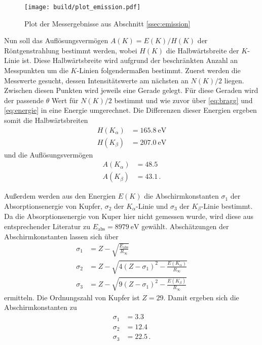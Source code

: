 \begin{figure}
    \centering
    \texttt{[image: build/plot\_emission.pdf]}
    \caption{Plot der Messergebnisse aus Abschnitt \ref{ssec:emission}}
    \label{fig:plot_emission}
\end{figure}

Nun soll das Auflösungsvermögen $A(K)=E(K)/H(K)$ der Röntgenstrahlung bestimmt werden, wobei $H(K)$ die Halbwärtsbreite der $K$-Linie ist.
Diese Halbwärtsbreite wird aufgrund der beschränkten Anzahl an Messpunkten um die $K$-Linien folgendermaßen bestimmt.
Zuerst werden die Messwerte gesucht, dessen Intensitätswerte am nächsten an $N(K)/2$ liegen.
Zwischen diesen Punkten wird jeweils eine Gerade gelegt.
Für diese Geraden wird der passende $\theta$ Wert für $N(K)/2$ bestimmt und wie zuvor über \autoref{eq:bragg} und \autoref{eq:energie} in eine Energie umgerechnet.
Die Differenzen dieser Energien ergeben somit die Halbwärtsbreiten
\begin{align*}
    H(K_\alpha) &= \SI{165.8}{\electronvolt} \\
    H(K_\beta) &= \SI{207.0}{\electronvolt}
\end{align*}
und die Auflösungsvermögen
\begin{align*}
    A(K_\alpha) &= \num{48.5} \\
    A(K_\beta) &= \num{43.1} \,.
\end{align*}

Außerdem werden aus den Energien $E(K)$ die Abschirmkonstanten $\sigma_1$ der Absorptionsenergie von Kupfer, $\sigma_2$ der $K_\alpha$-Linie und $\sigma_3$ der $K_\beta$-Linie bestimmt.
Da die Absorptionsenergie von Kuper hier nicht gemessen wurde, wird diese aus entsprechender Literatur zu $E_\text{abs}=\SI{8979}{\electronvolt}$ gewählt.\cite{absorption}
Abschätzungen der Abschirmkonstanten lassen sich über 
\begin{align}
    \sigma_1 &= Z - \sqrt{\frac{E_\text{abs}}{R_\infty}} \\
    \sigma_2 &= Z - \sqrt{4(Z-\sigma_1)^2-\frac{E(K_\alpha)}{R_\infty}} \\
    \sigma_3 &= Z - \sqrt{9(Z-\sigma_1)^2-\frac{E(K_\beta)}{R_\infty}}
\end{align}
ermitteln.\cite[Gleichungen (8),(9),(10)]{V602} 
Die Ordnungszahl von Kupfer ist $Z=29$.
Damit ergeben sich die Abschirmkonstanten zu
\begin{align*}
    \sigma_1 &= \num{3.3} \\
    \sigma_2 &= \num{12.4} \\
    \sigma_3 &= \num{22.5} \, .
\end{align*}



